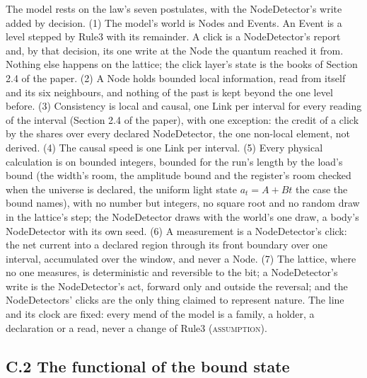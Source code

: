 \documentclass[pdflatex,sn-mathphys-num]{sn-jnl}
\newcommand{\claimmark}[1]{\textup{\textsc{#1}}}
\theoremstyle{thmstyleone}
\begin{document}
The model rests on the law's seven postulates, with the NodeDetector's write added by decision. (1) The model's world is Nodes and Events. An Event is a level stepped by Rule3 with its remainder. A click is a NodeDetector's report and, by that decision, its one write at the Node the quantum reached it from. Nothing else happens on the lattice; the click layer's state is the books of Section 2.4 of the paper. (2) A Node holds bounded local information, read from itself and its six neighbours, and nothing of the past is kept beyond the one level before. (3) Consistency is local and causal, one Link per interval for every reading of the interval (Section 2.4 of the paper), with one exception: the credit of a click by the shares over every declared NodeDetector, the one non-local element, not derived. (4) The causal speed is one Link per interval. (5) Every physical calculation is on bounded integers, bounded for the run's length by the load's bound (the width's room, the amplitude bound and the register's room checked when the universe is declared, the uniform light state $a_t = A + Bt$ the case the bound names), with no number but integers, no square root and no random draw in the lattice's step; the NodeDetector draws with the world's one draw, a body's NodeDetector with its own seed. (6) A measurement is a NodeDetector's click: the net current into a declared region through its front boundary over one interval, accumulated over the window, and never a Node. (7) The lattice, where no one measures, is deterministic and reversible to the bit; a NodeDetector's write is the NodeDetector's act, forward only and outside the reversal; and the NodeDetectors' clicks are the only thing claimed to represent nature. The line and its clock are fixed: every mend of the model is a family, a holder, a declaration or a read, never a change of Rule3 (\claimmark{assumption}).

\subsection*{C.2 The functional of the bound state}
\end{document}
